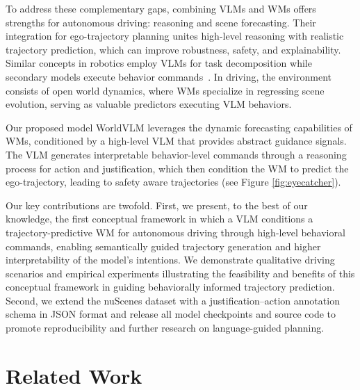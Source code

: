 \documentclass[letterpaper, 10 pt, conference]{ieeeconf}
\begin{document}
To address these complementary gaps, combining VLMs and WMs offers strengths for autonomous driving: reasoning and scene forecasting. Their integration for ego-trajectory planning unites high-level reasoning with realistic trajectory prediction, which can improve robustness, safety, and explainability. Similar concepts in robotics employ VLMs for task decomposition while secondary models execute behavior commands~\cite{ahn2022can, driess2023palm}. In driving, the environment consists of open world dynamics, where WMs specialize in regressing scene evolution, serving as valuable predictors executing VLM behaviors.


Our proposed model WorldVLM leverages the dynamic forecasting capabilities of WMs, conditioned by a high-level VLM that provides abstract guidance signals. The VLM generates interpretable behavior-level commands through a reasoning process for action and justification, which then condition the WM to predict the ego-trajectory, leading to safety aware trajectories (see Figure \ref{fig:eyecatcher}).

Our key contributions are twofold. 
First, we present, to the best of our knowledge, the first conceptual framework in which a VLM conditions a trajectory-predictive WM for autonomous driving through high-level behavioral commands, enabling semantically guided trajectory generation and higher interpretability of the model's intentions. We demonstrate qualitative driving scenarios and empirical experiments illustrating the feasibility and benefits of this conceptual framework in guiding behaviorally informed trajectory prediction. Second, we extend the nuScenes dataset with a justification–action annotation schema in JSON format and release all model checkpoints and source code to promote reproducibility and further research on language-guided planning. 


\section{Related Work}
\end{document}
